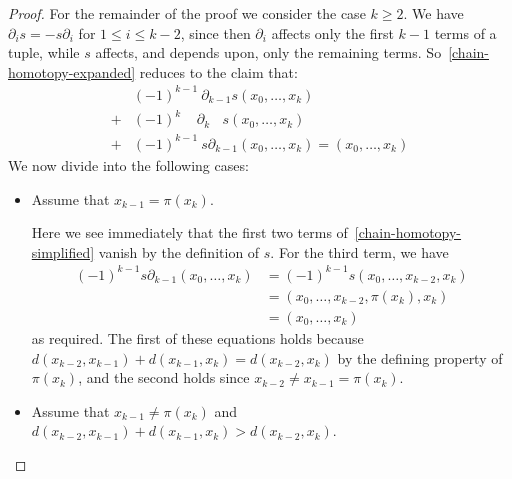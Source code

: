 \documentclass[10pt,a4paper]{amsart}
\begin{document}
\begin{proof}
    For the remainder of the proof we consider the case $k\geq 2$.
    We have $\partial_i s = -s\partial_i$ for $1\leq i\leq k-2$,
    since then $\partial_i$ affects only the first $k-1$ terms
    of a tuple, while $s$ affects, and depends upon, only the 
    remaining terms.
    So~\eqref{chain-homotopy-expanded} reduces to the claim
    that:
    \begin{equation}\label{chain-homotopy-simplified}
        \begin{split}
    	&(-1)^{k-1}\ \partial_{k-1}s(x_0,\ldots,x_k)
            \\
    	+
    	&(-1)^{k\phantom{-1}}\ \partial_{k\phantom{-1}} s(x_0,\ldots,x_k)
            \\
    	+&(-1)^{k-1}\ s\partial_{k-1}(x_0,\ldots,x_k)
            =
            (x_0,\ldots,x_k)
        \end{split}
    \end{equation}
    We now divide into the following cases:
    \begin{itemize}
        \item
        Assume that $x_{k-1}=\pi(x_k)$.
        
        Here we see immediately that  
        the first two terms of~\eqref{chain-homotopy-simplified} 
        vanish by the definition of $s$.
        For the third term, we have
        \begin{align*}
            (-1)^{k-1}s\partial_{k-1}(x_0,\ldots,x_k)
            &=
            (-1)^{k-1}s(x_0,\ldots,x_{k-2},x_k)
            \\
            &=
            (x_0,\ldots,x_{k-2},\pi(x_k),x_k)
            \\
            &=
            (x_0,\ldots,x_k)
        \end{align*}
        as required.
        The first of these equations holds because 
        $d(x_{k-2},x_{k-1})+d(x_{k-1},x_k) = d(x_{k-2},x_k)$
        by the defining property of $\pi(x_k)$,
        and the second holds since  $x_{k-2}\neq x_{k-1}=\pi(x_k)$.
        
        \item
        Assume that $x_{k-1}\neq \pi(x_k)$
        and
        $d(x_{k-2},x_{k-1})+d(x_{k-1},x_k) > d(x_{k-2},x_k)$.
        

\end{itemize}
\end{proof}
\end{document}
